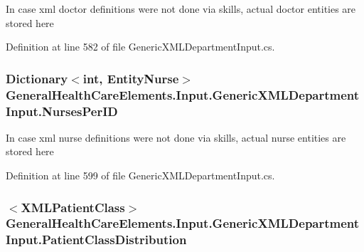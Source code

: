 In case xml doctor definitions were not done via skills, actual doctor entities are stored here 



Definition at line 582 of file Generic\+X\+M\+L\+Department\+Input.\+cs.

\subsubsection[{\texorpdfstring{Nurses\+Per\+ID}{NursesPerID}}]{\setlength{\rightskip}{0pt plus 5cm}Dictionary$<$int, {\bf Entity\+Nurse}$>$ General\+Health\+Care\+Elements.\+Input.\+Generic\+X\+M\+L\+Department\+Input.\+Nurses\+Per\+ID\hspace{0.3cm}{\ttfamily [get]}}\hypertarget{class_general_health_care_elements_1_1_input_1_1_generic_x_m_l_department_input_a4b10a81a9fde94f3974bd648da5b739a}{}\label{class_general_health_care_elements_1_1_input_1_1_generic_x_m_l_department_input_a4b10a81a9fde94f3974bd648da5b739a}


In case xml nurse definitions were not done via skills, actual nurse entities are stored here 



Definition at line 599 of file Generic\+X\+M\+L\+Department\+Input.\+cs.

\subsubsection[{\texorpdfstring{Patient\+Class\+Distribution}{PatientClassDistribution}}]{$<${\bf X\+M\+L\+Patient\+Class}$>$ General\+Health\+Care\+Elements.\+Input.\+Generic\+X\+M\+L\+Department\+Input.\+Patient\+Class\+Distribution\hspace{0.3cm}{\ttfamily [get]}}\hypertarget{class_general_health_care_elements_1_1_input_1_1_generic_x_m_l_department_input_ada1853b40561d966bab501249a3ea4b5}{}\label{class_general_health_care_elements_1_1_input_1_1_generic_x_m_l_department_input_ada1853b40561d966bab501249a3ea4b5}


